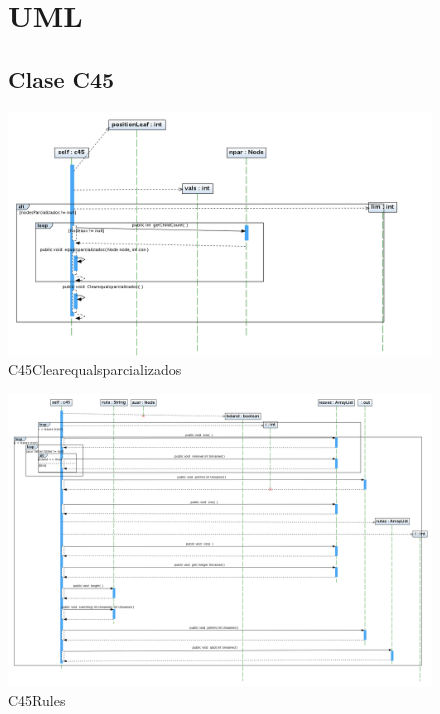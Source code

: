 \documentclass[letterpaper,12pt]{report}
\begin{document}
\addtolength{\textwidth}{-3cm}
\begin{figure}
\chapter{UML}


\section{Clase C45}
\centering
\includegraphics[width=1.2\textwidth]{c45/C45Clearequalsparcializados.png}
\caption{C45Clearequalsparcializados}
\end{figure}
\newpage
\begin{figure}
\centering
\includegraphics[angle=90, width=1\textwidth]{c45/C45Rules.png}
\caption{C45Rules}
\end{figure}
\newpage
\end{document}
